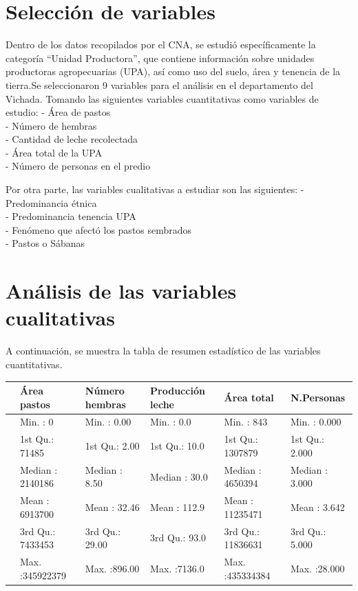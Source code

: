 \documentclass[]{tufte-handout}
\begin{document}
\section{Selección de variables}\label{selecciuxf3n-de-variables}

Dentro de los datos recopilados por el CNA, se estudió específicamente
la categoría ``Unidad Productora'', que contiene información sobre
unidades productoras agropecuarias (UPA), así como uso del suelo, área y
tenencia de la tierra.Se seleccionaron 9 variables para el análisis en
el departamento del Vichada. Tomando las siguientes variables
cuantitativas como variables de estudio: - Área de pastos\\
- Número de hembras\\
- Cantidad de leche recolectada\\
- Área total de la UPA\\
- Número de personas en el predio

Por otra parte, las variables cualitativas a estudiar son las
siguientes: - Predominancia étnica\\
- Predominancia tenencia UPA\\
- Fenómeno que afectó los pastos sembrados\\
- Pastos o Sábanas

\section{Análisis de las variables
cualitativas}\label{anuxe1lisis-de-las-variables-cualitativas}

A continuación, se muestra la tabla de resumen estadístico de las
variables cuantitativas. \vspace{0,5 cm}

\begin{tabular}{llllll}
\toprule
  &  Área pastos & Número hembras & Producción leche &   Área total &   N.Personas\\
\midrule
 & Min.   :        0 & Min.   :  0.00 & Min.   :   0.0 & Min.   :      843 & Min.   : 0.000\\
 & 1st Qu.:    71485 & 1st Qu.:  2.00 & 1st Qu.:  10.0 & 1st Qu.:  1307879 & 1st Qu.: 2.000\\
 & Median :  2140186 & Median :  8.50 & Median :  30.0 & Median :  4650394 & Median : 3.000\\
 & Mean   :  6913700 & Mean   : 32.46 & Mean   : 112.9 & Mean   : 11235471 & Mean   : 3.642\\
 & 3rd Qu.:  7433453 & 3rd Qu.: 29.00 & 3rd Qu.:  93.0 & 3rd Qu.: 11836631 & 3rd Qu.: 5.000\\
\addlinespace
 & Max.   :345922379 & Max.   :896.00 & Max.   :7136.0 & Max.   :435334384 & Max.   :28.000\\
\bottomrule
\end{tabular}
\end{document}
